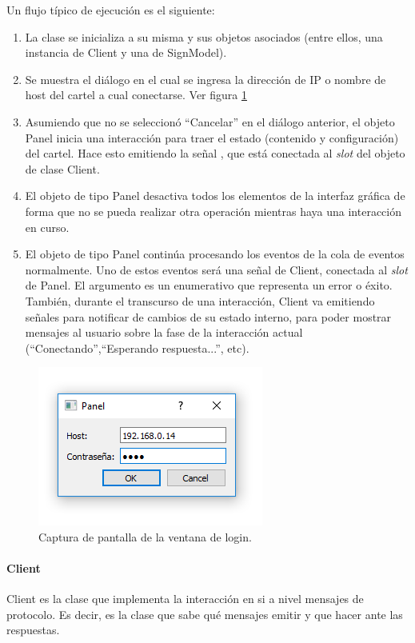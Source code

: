 Un flujo típico de ejecución es el siguiente:
\begin{enumerate}
	\item La clase se inicializa a su misma y sus objetos asociados (entre ellos, una instancia de Client y una de SignModel).
	\item Se muestra el diálogo en el cual se ingresa la dirección de IP o nombre de host del cartel a cual conectarse. Ver figura \ref{fig:login}
	\item Asumiendo que no se seleccionó \enquote{Cancelar} en el diálogo anterior, el objeto Panel inicia una interacción para traer el estado (contenido y configuración) del cartel. Hace esto emitiendo la señal , que está conectada al \emph{slot}  del objeto de clase Client.
	\item El objeto de tipo Panel desactiva todos los elementos de la interfaz gráfica de forma que no se pueda realizar otra operación mientras haya una interacción en curso.
	\item El objeto de tipo Panel continúa procesando los eventos de la cola de eventos normalmente. Uno de estos eventos será una señal  de Client, conectada al \emph{slot}  de Panel. El argumento es un enumerativo que representa un error o éxito. También, durante el transcurso de una interacción, Client va emitiendo señales para notificar de cambios de su estado interno, para poder mostrar mensajes al usuario sobre la fase de la interacción actual (\enquote{Conectando},\enquote{Esperando respuesta...}, etc).
\end{enumerate}

\begin{figure}[hbtp]
	\centering
	\includegraphics[scale=0.8]{imagenes/login.png}
	\caption{Captura de pantalla de la ventana de login.}
	\label{fig:login}
\end{figure}

\paragraph{Client}
Client es la clase que implementa la interacción en si a nivel mensajes de protocolo. Es decir, es la clase que sabe qué mensajes emitir y que hacer ante las respuestas.

